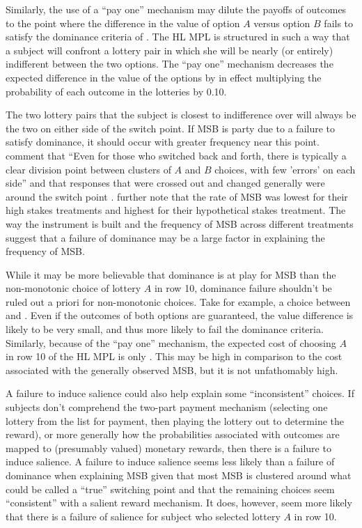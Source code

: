 \documentclass[../main.tex]{subfiles}
\begin{document}
Similarly, the use of a \enquote{pay one} mechanism may dilute the payoffs of outcomes to the point where the difference in the value of option $A$ versus option $B$ fails to satisfy the dominance criteria of \textcite{Smith1982}.
The HL MPL is structured in such a way that a subject will confront a lottery pair in which she will be nearly (or entirely) indifferent between the two options.
The \enquote{pay one} mechanism decreases the expected difference in the value of the options by in effect multiplying the probability of each outcome in the lotteries by 0.10. 

The two lottery pairs that the subject is closest to indifference over will always be the two on either side of the switch point.
If MSB is party due to a failure to satisfy dominance, it should occur with greater frequency near this point.
\textcite[1648]{Holt2002} comment that \enquote{Even for those who switched back and forth, there is typically a clear division point between clusters of $A$ and $B$ choices, with few 'errors' on each side} and that responses that were crossed out and changed generally were around the switch point \parencite*[1646]{Holt2002}.
\textcite[1647-1648]{Holt2002} further note that the rate of MSB was lowest for their high stakes treatments and highest for their hypothetical stakes treatment.
The way the instrument is built and the frequency of MSB across different treatments suggest that a failure of dominance may be a large factor in explaining the frequency of MSB.

While it may be more believable that dominance is at play for MSB than the non-monotonic choice of lottery $A$ in row 10, dominance failure shouldn't be ruled out a priori for non-monotonic choices.
Take for example, a choice between  and .
Even if the outcomes of both options are guaranteed, the value difference is likely to be very small, and thus more likely to fail the dominance criteria.
Similarly, because of the \enquote{pay one} mechanism, the expected cost of choosing $A$ in row 10 of the HL MPL is only .
This may be high in comparison to the cost associated with the generally observed MSB, but it is not unfathomably high.

A failure to induce salience could also help explain some \enquote{inconsistent} choices.
If subjects don't comprehend the two-part payment mechanism (selecting one lottery from the list for payment, then playing the lottery out to determine the reward), or more generally how the probabilities associated with outcomes are mapped to (presumably valued) monetary rewards, then there is a failure to induce salience.
A failure to induce salience seems less likely than a failure of dominance when explaining MSB given that most MSB is clustered around what could be called a \enquote{true} switching point and that the remaining choices seem \enquote{consistent} with a salient reward mechanism.
It does, however, seem more likely that there is a failure of salience for subject who selected lottery $A$ in row 10.
\end{document}
